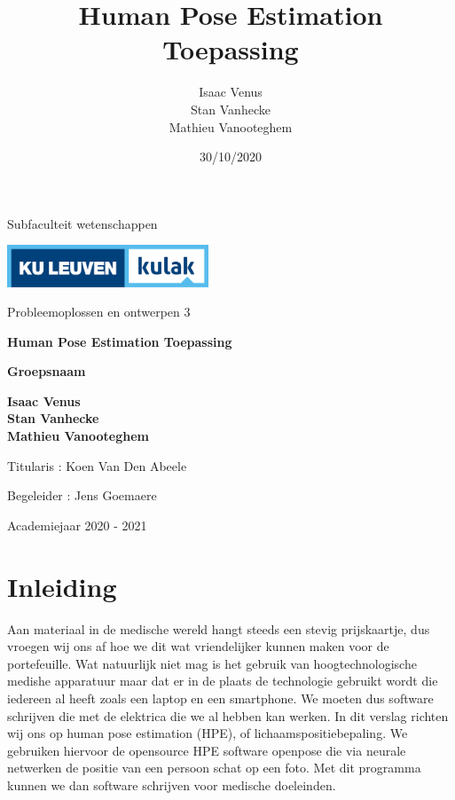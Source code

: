 \documentclass{article}
\title{Human Pose Estimation Toepassing}
\author{Isaac Venus\\
Stan Vanhecke\\
Mathieu Vanooteghem}
\date{30/10/2020}
\begin{document}
\pagestyle{empty}


\begin{center}
	{{\Large Subfaculteit wetenschappen}
	
	\vspace{1cm}
	
	\includegraphics[width=6cm]{2013-kulak-cmyk-highres.jpg}
	
	\vspace{1cm}
	
	\Large Probleemoplossen en ontwerpen 3}
	
	\vspace{2cm}

	{\Huge \textbf{Human Pose Estimation Toepassing}}
	
	\vspace{1cm}
	
	{\Large \textbf{Groepsnaam}}
	
	\vspace{1cm}
	
	{\Large \textbf{Isaac Venus}}\\
	{\Large \textbf{Stan Vanhecke}}\\
	{\Large \textbf{Mathieu Vanooteghem}}\\

\end{center}

\vspace{2cm}
{\Large Titularis : Koen Van Den Abeele}
\vspace{1cm}

{\Large Begeleider : Jens Goemaere}


\vspace{1cm}

\begin{center}
	{\Large Academiejaar 2020 - 2021}
\end{center}

\clearpage
\tableofcontents
\clearpage

\section*{Inleiding}
Aan materiaal in de medische wereld hangt steeds een stevig prijskaartje, dus vroegen wij ons af hoe we dit wat vriendelijker kunnen maken voor de portefeuille. Wat natuurlijk niet mag is het gebruik van hoogtechnologische medishe apparatuur maar dat er in de plaats de technologie gebruikt wordt die iedereen al heeft zoals een laptop en een smartphone. We moeten dus software schrijven die met de elektrica die we al hebben kan werken. In dit verslag richten wij ons op human pose estimation (HPE), of lichaamspositiebepaling. We gebruiken hiervoor de opensource HPE software openpose die via neurale netwerken de positie van een persoon schat op een foto. Met dit programma kunnen we dan software schrijven voor medische doeleinden.
\end{document}
